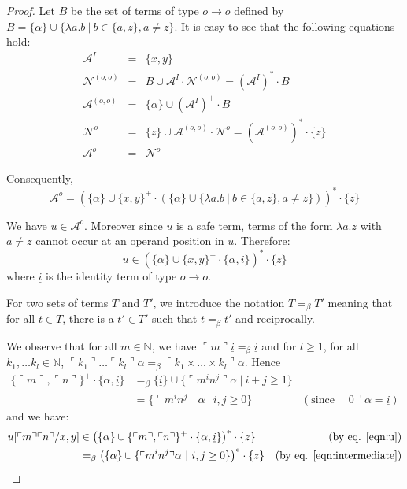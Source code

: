 \documentclass{article}
\newcommand{\encode}[1]{\ulcorner #1 \urcorner}
\newcommand{\nat}{\mathbb{N}}
\newcommand{\union}{\cup}
\begin{document}
\begin{proof}
Let $B$ be the set of terms of type $o\rightarrow o$ defined by $B = \{ \alpha \} \union \{ \lambda a.b \ | \ b \in \{a,z\}, a \neq z \}$.
It is easy to see that the following equations hold:
\begin{eqnarray*}
\mathcal{A}^I &=& \{ x,y \} \\
\mathcal{N}^{(o,o)} &=& B \union \mathcal{A}^I \cdot
\mathcal{N}^{(o,o)} = (\mathcal{A}^I)^* \cdot B \\
\mathcal{A}^{(o,o)} &=& \{ \alpha \} \union (\mathcal{A}^I)^+ \cdot B \\
\mathcal{N}^o &=& \{ z \} \union \mathcal{A}^{(o,o)} \cdot \mathcal{N}^o = (\mathcal{A}^{(o,o)})^* \cdot \{ z \} \\
\mathcal{A}^o &=& \mathcal{N}^{o}
\end{eqnarray*}

Consequently, $$\mathcal{A}^o = \left( \{\alpha \} \union \{x,y\}^+ \cdot \left( \{\alpha \} \union \{\lambda a.b \ | \ b \in \{a,z\}, a \neq z \} \right) \right)^* \cdot \{ z \}$$

We have $u \in \mathcal{A}^o$. Moreover since $u$ is a safe term,
terms of the form $\lambda a . z$ with $a \neq z$ cannot occur at an
operand position in $u$. Therefore:
\begin{equation}
u \in \left( \{\alpha\} \union \{x,y\}^+ \cdot \{\alpha,
\underline{i} \} \right)^* \cdot \{ z \} \label{eqn:u}
\end{equation}
where $\underline{i}$ is the identity term of type $o\rightarrow o$.

For two sets of terms $T$ and $T'$, we introduce the notation $T =_\beta T'$ meaning that for all $t \in T$, there is a $t' \in T'$ such that $t =_\beta t'$ and reciprocally.

We observe that for all $m \in \nat$, we have $\encode{m} \underline{i} =_\beta \underline{i}$ and for $l\geq 1$, for all $k_1, \ldots k_l \in \nat$,
$\encode{k_1}\ldots \encode{k_l} \alpha =_\beta
\encode{k_1\times \ldots \times k_l} \alpha$. Hence
\begin{align}
\{\encode{m},\encode{n}\}^+ \cdot \{\alpha, \underline{i} \} &=_\beta
\{ \underline{i} \} \union
\{ \encode{m^i n^j} \alpha \ |\ i+j \geq 1 \} \nonumber \\
&= \{ \encode{m^i n^j} \alpha \ |\ i,j \geq 0 \} & ( \mbox{since } \encode{0} \alpha = \underline{i}) \label{eqn:intermediate}
\end{align}
and we have:
\begin{align*}
u[\encode{m} \encode{n}/x,y] &\in \left( \{ \alpha \} \union \{\encode{m},\encode{n}\}^+ \cdot \{\alpha, \underline{i} \} \right)^* \cdot \{ z \}  & \mbox{(by eq. \ref{eqn:u})} \\
&=_\beta \left( \{\alpha \} \union \{ \encode{m^i n^j}
\alpha \ | \ i,j \geq 0 \} \right)^* \cdot \{ z \} & \mbox{(by eq. \ref{eqn:intermediate})}
\end{align*}


\end{proof}
\end{document}
